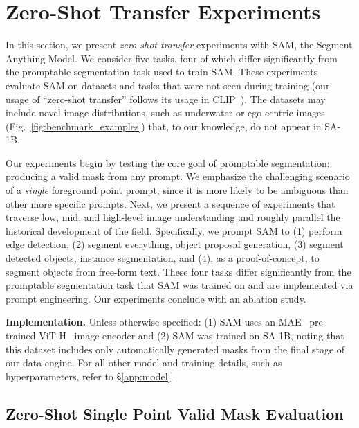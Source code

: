 \documentclass[10pt,twocolumn,letterpaper]{article}
\renewcommand{\paragraph}[1]{\vspace{1.25mm}\noindent\textbf{#1}}
\newcommand{\sad}{\mbox{SA-1B}\xspace}
\newcommand{\sam}{SAM\xspace}
\newcommand{\fig}[1]{Fig.~\ref{#1}}
\begin{document}
\section{Zero-Shot Transfer Experiments}\label{sec:eval}

In this section, we present \emph{zero-shot transfer} experiments with \sam, the Segment Anything Model. We consider five tasks, four of which differ significantly from the promptable segmentation task used to train \sam. These experiments evaluate \sam on datasets and tasks that were not seen during training (our usage of ``zero-shot transfer'' follows its usage in CLIP~\cite{Radford2021}). The datasets may include novel image distributions, such as underwater or ego-centric images (\eg \fig{fig:benchmark_examples}) that, to our knowledge, do not appear in \sad.

Our experiments begin by testing the core goal of promptable segmentation: producing a valid mask from any prompt. We emphasize the challenging scenario of a \emph{single} foreground point prompt, since it is more likely to be ambiguous than other more specific prompts. Next, we present a sequence of experiments that traverse low, mid, and high-level image understanding and roughly parallel the historical development of the field. Specifically, we prompt \sam to (1) perform edge detection, (2) segment everything, \ie object proposal generation, (3) segment detected objects, \ie instance segmentation, and (4), as a proof-of-concept, to segment objects from free-form text. These four tasks differ significantly from the promptable segmentation task that \sam was trained on and are implemented via prompt engineering. Our experiments conclude with an ablation study.

\paragraph{Implementation.} Unless otherwise specified: (1) \sam uses an MAE~\cite{he2022masked} pre-trained ViT-H~\cite{Dosovitskiy2021} image encoder and (2) \sam was trained on \sad, noting that this dataset includes only automatically generated masks from the final stage of our data engine. For all other model and training details, such as hyperparameters, refer to \S\ref{app:model}.

\subsection{Zero-Shot Single Point Valid Mask Evaluation}\label{sec:eval:single_point}\vspace{-2mm}
\end{document}
